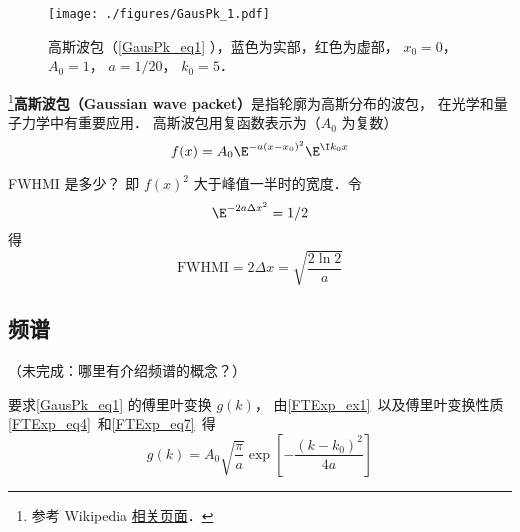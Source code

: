 
\begin{issues}
\issueDraft
\end{issues}


\begin{figure}[ht]
\centering
\texttt{[image: ./figures/GausPk\_1.pdf]}
\caption{高斯波包（\autoref{GausPk_eq1} ），蓝色为实部，红色为虚部， $x_0 = 0$， $A_0 = 1$， $a = 1/20$， $k_0 = 5$．} \label{GausPk_fig1}
\end{figure}

\footnote{参考 Wikipedia \href{https://en.wikipedia.org/wiki/Wave_packet}{相关页面}．}\textbf{高斯波包（Gaussian wave packet）}是指轮廓为高斯分布的波包， 在光学和量子力学中有重要应用． 高斯波包用复函数表示为（$A_0$ 为复数）
\begin{equation}\label{GausPk_eq1}
f(x) = A_0 \E^{-a(x-x_0)^2}\E^{\I k_0 x}
\end{equation}

FWHMI 是多少？ 即 $f(x)^2$ 大于峰值一半时的宽度．令
\begin{equation}
\E^{-2a\Delta x^2} = 1/2
\end{equation}
得
\begin{equation}
\mathrm{FWHMI} = 2\Delta x = \sqrt{\frac{2\ln 2}{a}}
\end{equation}

\subsection{频谱}
（未完成：哪里有介绍频谱的概念？）

要求\autoref{GausPk_eq1} 的傅里叶变换 $g(k)$， 由\autoref{FTExp_ex1}~以及傅里叶变换性质\autoref{FTExp_eq4}~和\autoref{FTExp_eq7}~得
\begin{equation}
g(k) = A_0\sqrt{\frac{\pi}{a}} \exp[-\frac{(k-k_0)^2}{4a}]
\end{equation}
